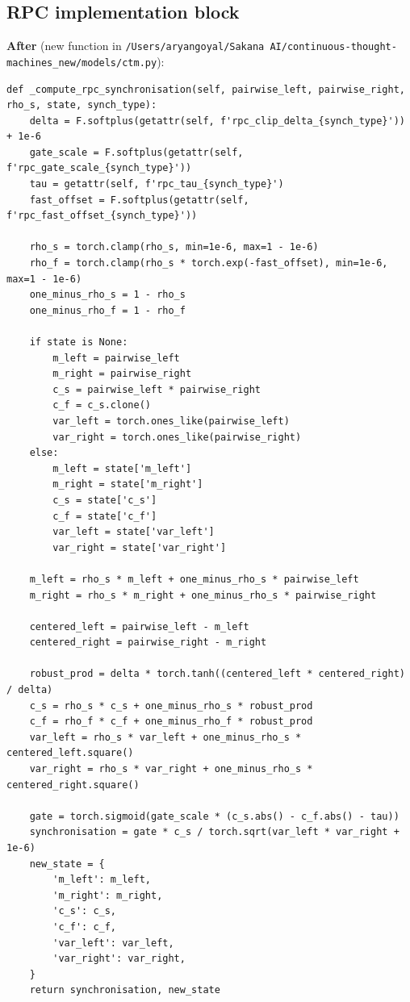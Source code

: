 \documentclass[11pt]{article}
\begin{document}
\subsection{RPC implementation block}
\textbf{After} (new function in \texttt{/Users/aryangoyal/Sakana AI/continuous-thought-machines\_new/models/ctm.py}):
\begin{lstlisting}[style=pycode]
def _compute_rpc_synchronisation(self, pairwise_left, pairwise_right, rho_s, state, synch_type):
    delta = F.softplus(getattr(self, f'rpc_clip_delta_{synch_type}')) + 1e-6
    gate_scale = F.softplus(getattr(self, f'rpc_gate_scale_{synch_type}'))
    tau = getattr(self, f'rpc_tau_{synch_type}')
    fast_offset = F.softplus(getattr(self, f'rpc_fast_offset_{synch_type}'))

    rho_s = torch.clamp(rho_s, min=1e-6, max=1 - 1e-6)
    rho_f = torch.clamp(rho_s * torch.exp(-fast_offset), min=1e-6, max=1 - 1e-6)
    one_minus_rho_s = 1 - rho_s
    one_minus_rho_f = 1 - rho_f

    if state is None:
        m_left = pairwise_left
        m_right = pairwise_right
        c_s = pairwise_left * pairwise_right
        c_f = c_s.clone()
        var_left = torch.ones_like(pairwise_left)
        var_right = torch.ones_like(pairwise_right)
    else:
        m_left = state['m_left']
        m_right = state['m_right']
        c_s = state['c_s']
        c_f = state['c_f']
        var_left = state['var_left']
        var_right = state['var_right']

    m_left = rho_s * m_left + one_minus_rho_s * pairwise_left
    m_right = rho_s * m_right + one_minus_rho_s * pairwise_right

    centered_left = pairwise_left - m_left
    centered_right = pairwise_right - m_right

    robust_prod = delta * torch.tanh((centered_left * centered_right) / delta)
    c_s = rho_s * c_s + one_minus_rho_s * robust_prod
    c_f = rho_f * c_f + one_minus_rho_f * robust_prod
    var_left = rho_s * var_left + one_minus_rho_s * centered_left.square()
    var_right = rho_s * var_right + one_minus_rho_s * centered_right.square()

    gate = torch.sigmoid(gate_scale * (c_s.abs() - c_f.abs() - tau))
    synchronisation = gate * c_s / torch.sqrt(var_left * var_right + 1e-6)
    new_state = {
        'm_left': m_left,
        'm_right': m_right,
        'c_s': c_s,
        'c_f': c_f,
        'var_left': var_left,
        'var_right': var_right,
    }
    return synchronisation, new_state
\end{lstlisting}
\end{document}
